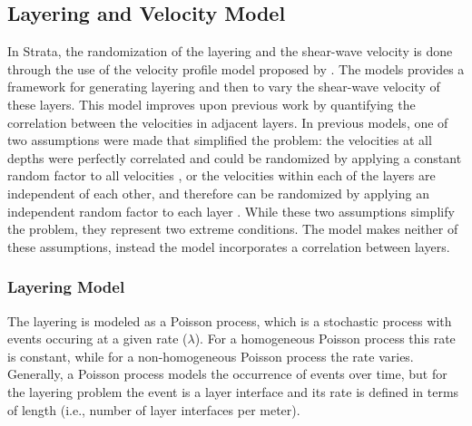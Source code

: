\documentclass[11pt]{report}
\begin{document}
\subsection{Layering and Velocity Model}\label{ch:var:models:layering}
In Strata, the randomization of the layering and the shear-wave velocity is done through the
use of the velocity profile model proposed by \citet{toro:95}.  The \citet{toro:95} models provides
a framework for generating layering and then to vary the shear-wave velocity of these layers.   This model
improves upon previous work by quantifying the correlation between the velocities in adjacent
layers.  In previous models, one of two assumptions were made that simplified the problem: the
velocities at all depths were perfectly correlated and could be randomized by applying a constant
random factor to all velocities \citep{mcguire:89, toro:92}, or the velocities within each of the
layers are independent of each other, and therefore can be randomized by applying an independent
random factor to each layer \citep{costantino:91}. While these two assumptions simplify the problem,
they represent two extreme conditions.  The \citet{toro:95} model makes neither of these
assumptions, instead the model incorporates a correlation between layers.

\subsubsection{Layering Model}
The layering is modeled as a Poisson process, which is a stochastic process with events occuring at
a given rate ($\lambda$).  For a homogeneous Poisson process this rate is constant, while for a
non-homogeneous Poisson process the rate varies.  Generally, a Poisson process models the occurrence
of events over time, but for the layering problem the event is a layer interface and its rate is
defined in terms of length (i.e., number of layer interfaces per meter).
\end{document}
